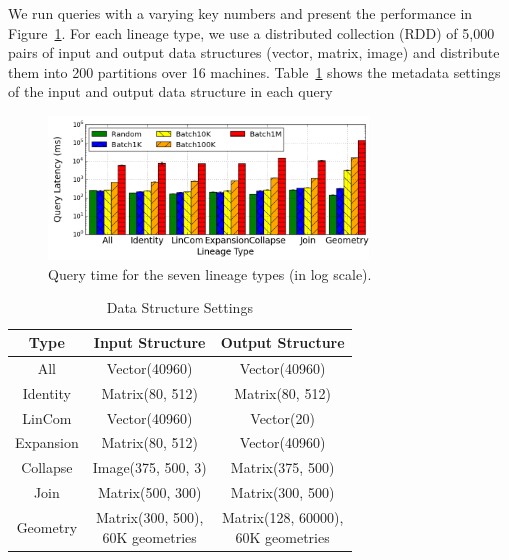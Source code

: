 \documentclass{sig-alternate}
\begin{document}
We run queries with a varying key numbers and present the performance in Figure~\ref{fig:typequery}. 
For each lineage type, we use a distributed collection (RDD) of 5,000 pairs of 
input and output data structures (vector, matrix, image) and distribute them into 200 partitions over 16 machines.
Table~\ref{tb:typequery-stats} shows the metadata settings of the input and output data structure in each query

\begin{figure}[t]
\begin{center}
    \includegraphics[width=85mm]{pictures/TypeQuery-Time}
\caption {Query time for the seven lineage types (in log scale).
    \label{fig:typequery}
}
\end{center}
\end{figure}

\begin{table}[t]
\begin{center}
    \caption{Data Structure Settings}
    \begin{scriptsize}
    \begin{tabular}{ | c | c | c |}
    \hline
    Type & Input Structure & Output Structure \\ \hline \hline
    All & Vector(40960) & Vector(40960) \\ \hline
    Identity & Matrix(80, 512) & Matrix(80, 512) \\ \hline
    LinCom & Vector(40960) & Vector(20) \\ \hline
    Expansion & Matrix(80, 512) & Vector(40960) \\ \hline
    Collapse & Image(375, 500, 3) & Matrix(375, 500) \\ \hline
    Join & Matrix(500, 300) & Matrix(300, 500) \\ \hline
    Geometry& \shortstack[l]{Matrix(300, 500), \\60K geometries} &  \shortstack[l]{Matrix(128, 60000), \\60K geometries} \\ \hline
    \end{tabular}
    \end{scriptsize}
    \label{tb:typequery-stats}
\end{center}   
\end{table}
\end{document}
